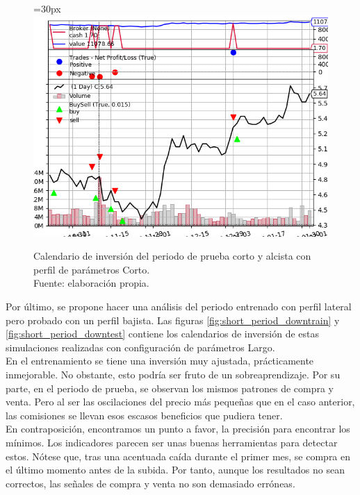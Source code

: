      	\begin{figure}[H]
     		\centering\leftskip=30px
     		\includegraphics[scale=0.70]{imagenes/S_Short_test.png}
     		\caption[Calendario de inversi\'on del periodo de prueba corto alcista]{Calendario de inversi\'on del periodo de prueba corto y alcista con perfil de par\'ametros Corto.\\ Fuente: elaboraci\'on propia.}
     		\label{fig:short_period_uptest}
     	\end{figure} 
     	
Por \'ultimo, se propone hacer una an\'alisis del periodo entrenado con perfil lateral pero probado con un perfil bajista. Las figuras \ref{fig:short_period_downtrain} y \ref{fig:short_period_downtest} contiene los calendarios de inversi\'on de estas simulaciones realizadas con configuraci\'on de par\'ametros Largo.\\

En el entrenamiento se tiene una inversi\'on muy ajustada, pr\'acticamente inmejorable. No obstante, esto podr\'ia ser fruto de un sobreaprendizaje. Por su parte, en el periodo de prueba, se observan los mismos patrones de compra y venta. Pero al ser las oscilaciones del precio m\'as peque\~nas que en el caso anterior, las comisiones se llevan esos escasos beneficios que pudiera tener.\\

En contraposici\'on, encontramos un punto a favor, la precisi\'on para encontrar los m\'inimos. Los indicadores parecen ser unas buenas herramientas para detectar estos. N\'otese que, tras una acentuada ca\'ida durante el primer mes, se compra en el \'ultimo momento antes de la subida. Por tanto, aunque los resultados no sean correctos, las se\~nales de compra y venta no son demasiado err\'oneas. \\
     	
